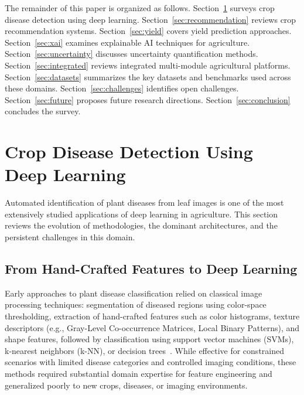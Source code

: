 \documentclass[journal]{IEEEtran}
\begin{document}
The remainder of this paper is organized as follows. Section~\ref{sec:disease} surveys crop disease detection using deep learning. Section~\ref{sec:recommendation} reviews crop recommendation systems. Section~\ref{sec:yield} covers yield prediction approaches. Section~\ref{sec:xai} examines explainable AI techniques for agriculture. Section~\ref{sec:uncertainty} discusses uncertainty quantification methods. Section~\ref{sec:integrated} reviews integrated multi-module agricultural platforms. Section~\ref{sec:datasets} summarizes the key datasets and benchmarks used across these domains. Section~\ref{sec:challenges} identifies open challenges. Section~\ref{sec:future} proposes future research directions. Section~\ref{sec:conclusion} concludes the survey.


\section{Crop Disease Detection Using Deep Learning}
\label{sec:disease}

Automated identification of plant diseases from leaf images is one of the most extensively studied applications of deep learning in agriculture. This section reviews the evolution of methodologies, the dominant architectures, and the persistent challenges in this domain.

\subsection{From Hand-Crafted Features to Deep Learning}

Early approaches to plant disease classification relied on classical image processing techniques: segmentation of diseased regions using color-space thresholding, extraction of hand-crafted features such as color histograms, texture descriptors (e.g., Gray-Level Co-occurrence Matrices, Local Binary Patterns), and shape features, followed by classification using support vector machines (SVMs), k-nearest neighbors (k-NN), or decision trees~\cite{barbedo2018factors}. While effective for constrained scenarios with limited disease categories and controlled imaging conditions, these methods required substantial domain expertise for feature engineering and generalized poorly to new crops, diseases, or imaging environments.
\end{document}
